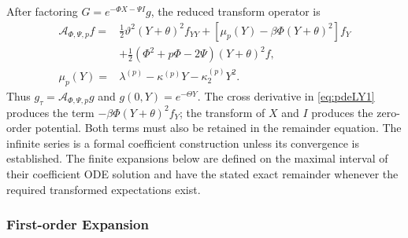 \documentclass[11pt,a4paper] {article}
\begin{document}
After factoring $G=e^{-\Phi X-\Psi I}g$, the reduced transform operator is
\begin{equation*}
\begin{split}
\mathcal A_{\Phi,\Psi,p} f
={}&\frac12\vartheta^2(Y+\theta)^2f_{YY}
 +\left[\mu_p(Y)-\beta\Phi(Y+\theta)^2\right]f_Y\\
&+\frac12(\Phi^2+p\Phi-2\Psi)(Y+\theta)^2f,\\
\mu_p(Y)={}&\lambda^{(p)}-\kappa^{(p)}Y-\kappa_2^{(p)}Y^2.
\end{split}
\end{equation*}
Thus $g_\tau=\mathcal A_{\Phi,\Psi,p}g$ and $g(0,Y)=e^{-\Theta Y}$.
The cross derivative in \eqref{eq:pdeLY1} produces the term
$-\beta\Phi(Y+\theta)^2f_Y$; the transform of $X$ and $I$ produces the
zero-order potential. Both terms must also be retained in the remainder equation.
The infinite series is a formal coefficient construction unless its convergence
is established. The finite expansions below are defined on the maximal interval
of their coefficient ODE solution and have the stated exact remainder whenever
the required transformed expectations exist.

\subsubsection{First-order Expansion}
 
\end{document}
